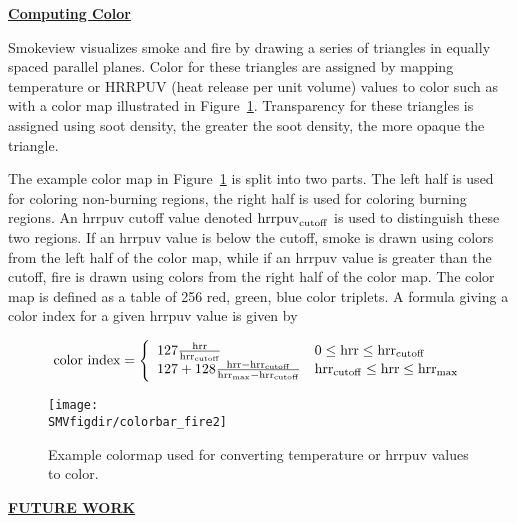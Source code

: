 \documentclass[11pt]{article}
\newcommand{\SMVfigdir}{../../../fig/smv/figures}
\newcommand{\ssection}[1]{\underline{\bf #1}}
\newcommand{\ssubsection}[1]{\underline{\bf #1}}
\begin{document}

\ssubsection{Computing Color}

Smokeview visualizes smoke and fire by drawing a series of triangles in equally spaced parallel planes.
Color for these triangles are assigned by mapping temperature or HRRPUV (heat release per unit volume)
values
to color such as with a color map illustrated in Figure~\ref{fig:colormaps}.
Transparency for these triangles is assigned using soot density, the greater the soot density,
the more opaque the triangle.

The example color map in Figure~\ref{fig:colormaps} is split into two parts.  The left half is used
for coloring non-burning regions, the right half is used for coloring burning regions.
An hrrpuv cutoff value denoted ${\rm hrrpuv}_{\rm cutoff}$ is used to
distinguish these two regions.
If an hrrpuv value is below the cutoff,
smoke is drawn using colors from the left half of the color map, while if an hrrpuv value is
greater than the cutoff,
fire is drawn using colors from the right half of the color map.  The color map is defined as a table
of 256 red, green, blue color triplets.  A formula giving a color index for a given hrrpuv value is given by

\newcommand{\hrr}{{\rm hrr}}
\newcommand{\hrrcutoff}{{\rm hrr}_{\rm cutoff}}
\newcommand{\hrrmax}{{\rm hrr}_{\rm max}}

\begin{eqnarray}
\mbox{color index}=\left\{
\begin{array}{ll}
  127\frac{\hrr}{\hrrcutoff} & 0 \le \hrr \le \hrrcutoff \\
  127 + 128\frac{\hrr-\hrrcutoff}{\hrrmax-\hrrcutoff} & \hrrcutoff \le \hrr \le \hrrmax
\end{array}
\right.
\end{eqnarray}

\begin{figure}[bph]
\begin{center}
\texttt{[image: \\SMVfigdir/colorbar\_fire2]}
\end{center}
\caption[Example colormap used for converting temperature or hrrpuv values to color.]
{Example colormap used for converting temperature or hrrpuv values to color.}
\label{fig:colormaps}
\end{figure}



\ssection{FUTURE WORK}
\end{document}
